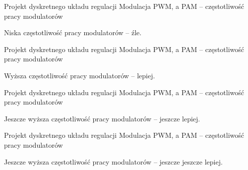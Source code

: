 \documentclass[11pt]{beamer}
\begin{document}
\begin{frame}{Projekt dyskretnego układu regulacji}
	{Modulacja PWM, a PAM --  częstotliwość pracy modulatorów}

Niska częstotliwość pracy modulatorów -- źle.

\begin{figure}[htbp!]
	\centering
	
	\subfloat[]{%
		\texttt{[image: uu\_h1e\_2]}%
	}%
	\hfill%
	\subfloat[]{%
		\texttt{[image: yy\_h1e\_2]}%
	}%
\end{figure}

\end{frame}


\begin{frame}{Projekt dyskretnego układu regulacji}
	{Modulacja PWM, a PAM --  częstotliwość pracy modulatorów}

Wyższa częstotliwość pracy modulatorów -- lepiej.

\begin{figure}[htbp!]
	\centering
	
	\subfloat[]{%
		\texttt{[image: uu\_h1e\_3]}%
	}%
	\hfill%
	\subfloat[]{%
		\texttt{[image: yy\_h1e\_3]}%
	}%
\end{figure}

\end{frame}


\begin{frame}{Projekt dyskretnego układu regulacji}
	{Modulacja PWM, a PAM --  częstotliwość pracy modulatorów}

Jeszcze wyższa częstotliwość pracy modulatorów -- jeszcze lepiej.

\begin{figure}[htbp!]
	\centering
	
	\subfloat[]{%
		\texttt{[image: uu\_h1e\_4]}%
	}%
	\hfill%
	\subfloat[]{%
		\texttt{[image: yy\_h1e\_4]}%
	}%
\end{figure}

\end{frame}


\begin{frame}{Projekt dyskretnego układu regulacji}
	{Modulacja PWM, a PAM --  częstotliwość pracy modulatorów}

Jeszcze wyższa częstotliwość pracy modulatorów -- jeszcze jeszcze lepiej.

\begin{figure}[htbp!]
	\centering
	
	\subfloat[]{%
		\texttt{[image: uu\_h1e\_5]}%
	}%
	\hfill%
	\subfloat[]{%
		\texttt{[image: yy\_h1e\_5]}%
	}%
\end{figure}

\end{frame}
\end{document}
